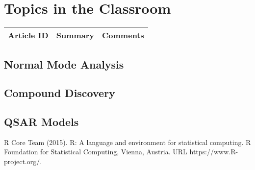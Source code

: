 \section{Topics in the Classroom}

\begin{table}[H]\centering
	\begin{tabular}{p{1cm}p{4cm}p{3cm}}
		Article ID & Summary & Comments\\
		\hline
		\hline
	\end{tabular}
\end{table}


\begin{thebibliography}{00}

\subsection{Normal Mode Analysis} 

\subsection{Compound Discovery} 

\subsection{QSAR Models}

R Core Team (2015). 
\newblock R: A language and environment for statistical computing. R Foundation for Statistical Computing, Vienna, Austria.
\newblock URL https://www.R-project.org/.

\end{thebibliography}


